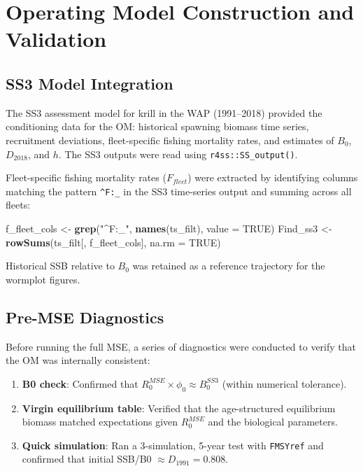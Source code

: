 \documentclass[
]{article}
\newenvironment{Shaded}{\begin{snugshade}}{\end{snugshade}}
\newcommand{\AttributeTok}[1]{\textcolor[rgb]{0.13,0.29,0.53}{#1}}
\newcommand{\ConstantTok}[1]{\textcolor[rgb]{0.56,0.35,0.01}{#1}}
\newcommand{\FunctionTok}[1]{\textcolor[rgb]{0.13,0.29,0.53}{\textbf{#1}}}
\newcommand{\NormalTok}[1]{#1}
\newcommand{\OtherTok}[1]{\textcolor[rgb]{0.56,0.35,0.01}{#1}}
\newcommand{\StringTok}[1]{\textcolor[rgb]{0.31,0.60,0.02}{#1}}
\providecommand{\tightlist}{%
  \setlength{\itemsep}{0pt}\setlength{\parskip}{0pt}}
\begin{document}
\pagebreak

\hypertarget{operating-model-construction-and-validation}{%
\section{Operating Model Construction and Validation}\label{operating-model-construction-and-validation}}

\hypertarget{ss3-model-integration}{%
\subsection{SS3 Model Integration}\label{ss3-model-integration}}

The SS3 assessment model for krill in the WAP (1991--2018) provided the conditioning data for the OM: historical spawning biomass time series, recruitment deviations, fleet-specific fishing mortality rates, and estimates of \(B_0\), \(D_{2018}\), and \(h\). The SS3 outputs were read using \texttt{r4ss::SS\_output()}.

Fleet-specific fishing mortality rates (\(F_{fleet}\)) were extracted by identifying columns matching the pattern \texttt{\^{}F:\_} in the SS3 time-series output and summing across all fleets:

\begin{Shaded}
\begin{Highlighting}[]
\NormalTok{f\_fleet\_cols }\OtherTok{\textless{}{-}} \FunctionTok{grep}\NormalTok{(}\StringTok{"\^{}F:\_"}\NormalTok{, }\FunctionTok{names}\NormalTok{(ts\_filt), }\AttributeTok{value =} \ConstantTok{TRUE}\NormalTok{)}
\NormalTok{Find\_ss3     }\OtherTok{\textless{}{-}} \FunctionTok{rowSums}\NormalTok{(ts\_filt[, f\_fleet\_cols], }\AttributeTok{na.rm =} \ConstantTok{TRUE}\NormalTok{)}
\end{Highlighting}
\end{Shaded}

Historical SSB relative to \(B_0\) was retained as a reference trajectory for the wormplot figures.

\hypertarget{pre-mse-diagnostics}{%
\subsection{Pre-MSE Diagnostics}\label{pre-mse-diagnostics}}

Before running the full MSE, a series of diagnostics were conducted to verify that the OM was internally consistent:

\begin{enumerate}
\def\labelenumi{\arabic{enumi}.}
\tightlist
\item
  \textbf{B0 check}: Confirmed that \(R_0^{MSE} \times \phi_0 \approx B_0^{SS3}\) (within numerical tolerance).
\item
  \textbf{Virgin equilibrium table}: Verified that the age-structured equilibrium biomass matched expectations given \(R_0^{MSE}\) and the biological parameters.
\item
  \textbf{Quick simulation}: Ran a 3-simulation, 5-year test with \texttt{FMSYref} and confirmed that initial SSB/B0 \(\approx D_{1991} = 0.808\).
\end{enumerate}
\end{document}

